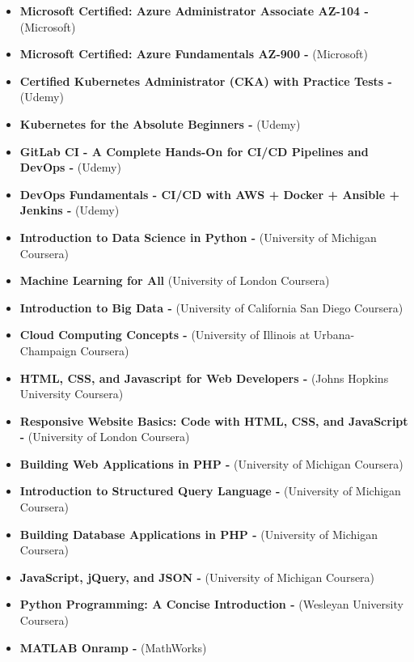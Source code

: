 \documentclass[10pt,a4paper,ragged2e,withhyper]{altacv}
\begin{document}
\begin{paracol}{2}
\begin{itemize}
\item \textbf{Microsoft Certified: Azure Administrator Associate AZ-104 -} (Microsoft)
\item \textbf{Microsoft Certified: Azure Fundamentals AZ-900 -} (Microsoft)
\item \textbf{Certified Kubernetes Administrator (CKA) with Practice Tests -} (Udemy)
\item \textbf{Kubernetes for the Absolute Beginners -} (Udemy)
\item \textbf{GitLab CI - A Complete Hands-On for CI/CD Pipelines and DevOps -} (Udemy)
\item \textbf{DevOps Fundamentals - CI/CD with AWS + Docker + Ansible + Jenkins -} (Udemy)
\item \textbf{Introduction to Data Science in Python -} (University of Michigan Coursera)
\item \textbf{Machine Learning for All} (University of London Coursera)
\item \textbf{Introduction to Big Data -} (University of California San Diego Coursera)
\item \textbf{Cloud Computing Concepts -} (University of Illinois at Urbana-Champaign Coursera)
\item \textbf{HTML, CSS, and Javascript for Web Developers -} (Johns Hopkins University Coursera)
\item \textbf{Responsive Website Basics: Code with HTML, CSS, and JavaScript -} (University of London Coursera)
\item \textbf{Building Web Applications in PHP -} (University of Michigan Coursera)
\item \textbf{Introduction to Structured Query Language -} (University of Michigan Coursera)
\item \textbf{Building Database Applications in PHP -} (University of Michigan Coursera)
\item \textbf{JavaScript, jQuery, and JSON -} (University of Michigan Coursera)
\item \textbf{Python Programming: A Concise Introduction -} (Wesleyan University Coursera)
\item \textbf{MATLAB Onramp -} (MathWorks)
\end{itemize}





\end{paracol}
\end{document}
